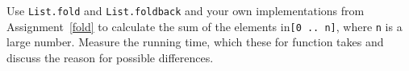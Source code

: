 Use \lstinline{List.fold} and \lstinline{List.foldback} and your own implementations from Assignment~\ref{fold} to calculate the sum of the elements in\lstinline{[0 .. n]}, where \lstinline{n} is a large number. Measure the running time, which these for function takes and discuss the reason for possible differences.
